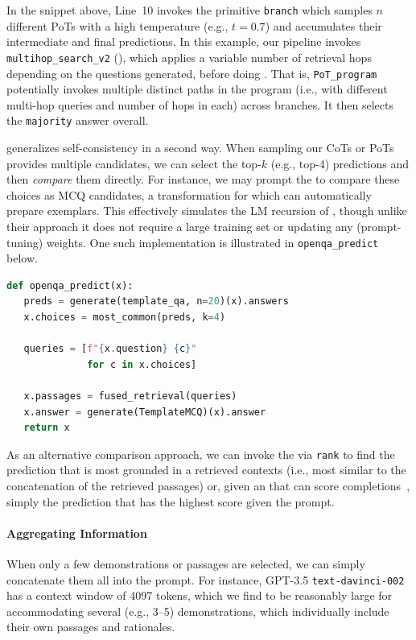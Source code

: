 In the snippet above, Line~10 invokes the primitive \texttt{branch} which samples $n$ different PoTs with a high temperature (e.g., $t=0.7$) and accumulates their intermediate and final predictions. In this example, our pipeline invokes \texttt{multihop\_search\_v2} (), which applies a variable number of retrieval hops depending on the questions generated, before doing \predict. That is, \texttt{PoT\_program} potentially invokes multiple distinct paths in the program (i.e., with different multi-hop queries and number of hops in each) across branches. It then selects the \texttt{majority} answer overall.

\DSP generalizes self-consistency in a second way. When sampling our CoTs or PoTs provides multiple candidates, we can select the top-$k$ (e.g., top-4) predictions and then \textit{compare} them directly. For instance, we may prompt the \LM{} to compare these choices as MCQ candidates, a transformation for which \demonstrate can automatically prepare exemplars. This effectively simulates the LM recursion of \citet{levine2022standing}, though unlike their approach it does not require a large training set or updating any (prompt-tuning) weights. One such implementation is illustrated in \texttt{openqa\_predict} below.

\begin{samepage}
\begin{lstlisting}[language=Python,breaklines=true]
def openqa_predict(x):
   preds = generate(template_qa, n=20)(x).answers
   x.choices = most_common(preds, k=4)
   
   queries = [f"{x.question} {c}"
              for c in x.choices]
              
   x.passages = fused_retrieval(queries)
   x.answer = generate(TemplateMCQ)(x).answer
   return x
\end{lstlisting}
\end{samepage}

As an alternative comparison approach, we can invoke the \RM{} via \texttt{rank} to find the prediction that is most grounded in a retrieved contexts (i.e., most similar to the concatenation of the retrieved passages) or, given an \RM{} that can score completions~\cite{krishna2022rankgen}, simply the prediction that has the highest score given the prompt.

\vspace{-2mm}
\paragraph{Aggregating Information}  When only a few demonstrations or passages are selected, we can simply concatenate them all into the prompt. For instance, GPT-3.5 \texttt{text-davinci-002} has a context window of 4097 tokens, which we find to be reasonably large for accommodating several (e.g., 3--5) demonstrations, which individually include their own passages and rationales.

